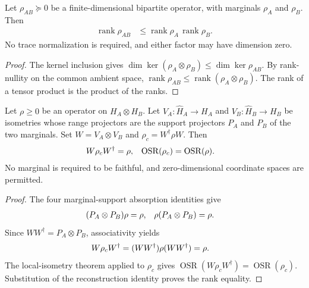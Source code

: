 \begin{theorem}
    \label{thm:rank_product_marginals}
    \leanok
    Let $\rho_{AB}\succeq0$ be a finite-dimensional bipartite operator,
    with marginals $\rho_A$ and $\rho_B$. Then
    \begin{align}
        \operatorname{rank}\rho_{AB}
         & \le\operatorname{rank}\rho_A\,\operatorname{rank}\rho_B.
    \end{align}
    No trace normalization is required, and either factor may have dimension zero.
\end{theorem}
\begin{proof}\leanok
    The kernel inclusion gives
    $\dim\ker(\rho_A\otimes\rho_B)\le\dim\ker\rho_{AB}$.
    By rank-nullity on the common ambient space,
    $\operatorname{rank}\rho_{AB}\le\operatorname{rank}(\rho_A\otimes\rho_B)$.
    The rank of a tensor product is the product of the ranks.
\end{proof}

\begin{theorem}
    \label{thm:operator_schmidt_rank_marginal_support_compression}
    \leanok

    Let $\rho\geq0$ be an operator on $H_A\otimes H_B$. Let
    $V_A:\widehat H_A\to H_A$ and $V_B:\widehat H_B\to H_B$ be isometries
    whose range projectors are the support projectors $P_A$ and $P_B$ of the
    two marginals. Set $W=V_A\otimes V_B$ and
    $\rho_c=W^\dagger\rho W$. Then
    \begin{align}
        W\rho_cW^\dagger & =\rho,
                         & \operatorname{OSR}(\rho_c) & =\operatorname{OSR}(\rho).
        \notag
    \end{align}
    No marginal is required to be faithful, and zero-dimensional coordinate
    spaces are permitted.
\end{theorem}
\begin{proof}\leanok
    The four marginal-support absorption identities give
    \begin{align}
        (P_A\otimes P_B)\rho & =\rho,
                             & \rho(P_A\otimes P_B) & =\rho.
        \notag
    \end{align}
    Since $WW^\dagger=P_A\otimes P_B$, associativity yields
    \begin{align}
        W\rho_cW^\dagger
         & =(WW^\dagger)\rho(WW^\dagger)=\rho.
        \notag
    \end{align}
    The local-isometry theorem applied to $\rho_c$ gives
    $\operatorname{OSR}(W\rho_cW^\dagger)=\operatorname{OSR}(\rho_c)$.
    Substitution of the reconstruction identity proves the rank equality.
\end{proof}

